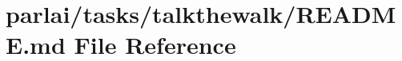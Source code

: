 \hypertarget{parlai_2tasks_2talkthewalk_2README_8md}{}\section{parlai/tasks/talkthewalk/\+R\+E\+A\+D\+ME.md File Reference}
\label{parlai_2tasks_2talkthewalk_2README_8md}
